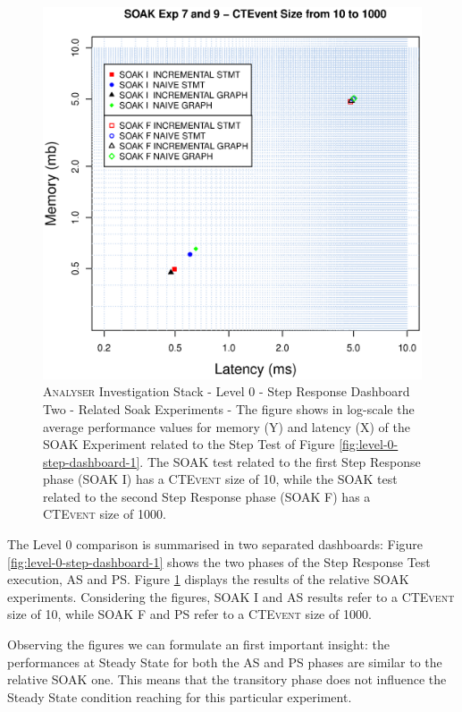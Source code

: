 \begin{figure}[htbp]
	\centering
	\includegraphics[width=0.90\linewidth]{images/level-0-step-dashboard-2}	
	\caption[\textsc{Analyser} Investigation Stack - Level 0 - Step Response Dashboard Two - Related Soak Experiments]{
\textsc{Analyser} Investigation Stack - Level 0 - Step Response Dashboard Two - Related Soak Experiments - The figure shows in log-scale the average performance values for memory (Y) and latency (X) of the SOAK Experiment related to the Step Test of Figure \ref{fig:level-0-step-dashboard-1}. The SOAK test related to the first Step Response phase (SOAK I) has a \textsc{CTEvent} size of 10, while the SOAK test related to the second Step Response phase (SOAK F) has a \textsc{CTEvent} size of 1000.}
	\label{fig:level-0-step-dashboard-2}
\end{figure}

The Level 0 comparison is summarised in two separated dashboards: Figure \ref{fig:level-0-step-dashboard-1} shows the two phases of the Step Response Test execution, AS and PS. Figure \ref{fig:level-0-step-dashboard-2} displays the results of the relative SOAK experiments. Considering the figures, SOAK I and AS results refer to a \textsc{CTEvent} size of 10, while SOAK F and PS refer to a \textsc{CTEvent} size of 1000.

Observing the figures we can formulate an first important insight: the performances at Steady State for both the AS and PS phases are similar to the relative SOAK one. This means that the transitory phase does not influence the Steady State condition reaching for this particular experiment.

